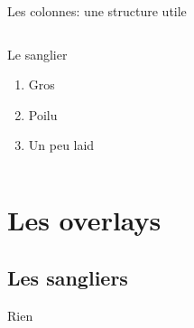 \documentclass[11pt]{beamer} %
\begin{document}
\begin{frame}{Les colonnes: une structure utile}
  \begin{columns}[c] %
    	
    	\begin{block}{Le sanglier}
    		\begin{enumerate}
    			\item Gros
    			\item Poilu
    			\item Un peu laid
    		\end{enumerate}
    	\end{block}
  \end{columns}
\end{frame}

\section{Les overlays}
\subsection{Les sangliers}

\begin{frame}{Rien}

\end{frame}
\end{document}
